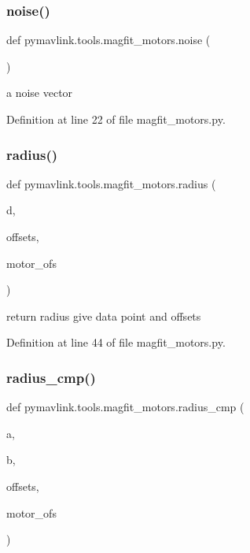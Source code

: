 \subsubsection{\texorpdfstring{noise()}{noise()}}
{\footnotesize\ttfamily def pymavlink.\+tools.\+magfit\+\_\+motors.\+noise (\begin{DoxyParamCaption}{ }\end{DoxyParamCaption})}

\begin{DoxyVerb}a noise vector\end{DoxyVerb}
 

Definition at line 22 of file magfit\+\_\+motors.\+py.

\mbox{\label{namespacepymavlink_1_1tools_1_1magfit__motors_a7251ec199a4f359bc17d4a45827cfd58}} 
\subsubsection{\texorpdfstring{radius()}{radius()}}
{\footnotesize\ttfamily def pymavlink.\+tools.\+magfit\+\_\+motors.\+radius (\begin{DoxyParamCaption}\item[{}]{d,  }\item[{}]{offsets,  }\item[{}]{motor\+\_\+ofs }\end{DoxyParamCaption})}

\begin{DoxyVerb}return radius give data point and offsets\end{DoxyVerb}
 

Definition at line 44 of file magfit\+\_\+motors.\+py.

\mbox{\label{namespacepymavlink_1_1tools_1_1magfit__motors_aa6e80f814cf0800c2263a28e37fc849f}} 
\subsubsection{\texorpdfstring{radius\_cmp()}{radius\_cmp()}}
{\footnotesize\ttfamily def pymavlink.\+tools.\+magfit\+\_\+motors.\+radius\+\_\+cmp (\begin{DoxyParamCaption}\item[{}]{a,  }\item[{}]{b,  }\item[{}]{offsets,  }\item[{}]{motor\+\_\+ofs }\end{DoxyParamCaption})}

